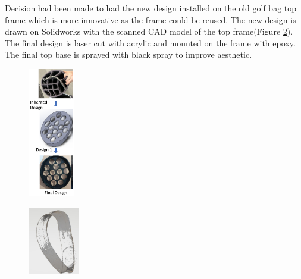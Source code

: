 \documentclass[11pt,landscape]{article}
\begin{document}
\begin{multicols}{3}
    Decision had been made to had the new design installed on the old golf bag
    top frame which is more innovative as the frame could be reused. The new
    design is drawn on Solidworks with the scanned CAD model of the top
    frame(Figure \ref{fig:CAD}). The final design is laser cut with acrylic and
    mounted on the frame with epoxy. The final top base is sprayed with black
    spray to improve aesthetic.
    \begin{figure}[H]
        \begin{center}
            \includegraphics[width=0.18\textwidth]{Figure.png}
            \label{fig:change}
        \end{center}
    \end{figure}
    
    \begin{figure}[H]
        \begin{center}
            \includegraphics[width=0.2\textwidth]{Figure.jpg}
            \label{fig:CAD}
        \end{center}
    \end{figure}
    
    

\end{multicols}
\end{document}
